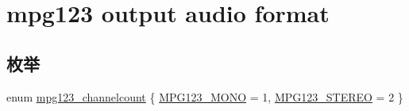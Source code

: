 \hypertarget{group__mpg123__output}{}\section{mpg123 output audio format}
\label{group__mpg123__output}
\subsection*{枚举}
\begin{DoxyCompactItemize}
\item 
enum \hyperlink{group__mpg123__output_ga94df916cae2fc81b8a6df88c1728eb1c}{mpg123\+\_\+channelcount} \{ \hyperlink{group__mpg123__output_gga94df916cae2fc81b8a6df88c1728eb1ca5429c88158462f4290639ec505227c0c}{M\+P\+G123\+\_\+\+M\+O\+NO} = 1, 
\hyperlink{group__mpg123__output_gga94df916cae2fc81b8a6df88c1728eb1ca52d7aff6b35da496e7f430b37c0d4602}{M\+P\+G123\+\_\+\+S\+T\+E\+R\+EO} = 2
 \}
\end{DoxyCompactItemize}
